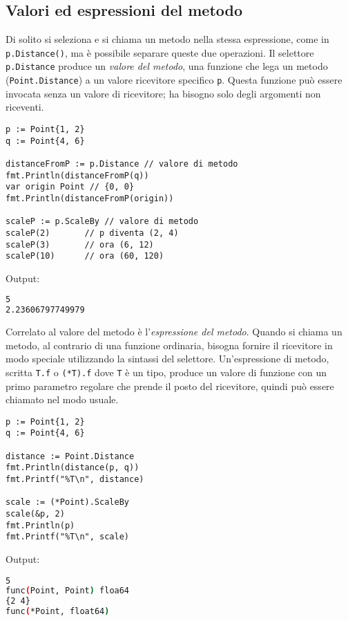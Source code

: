 \documentclass[../../thesis.tex]{subfiles}
\begin{document}
    \subsection{Valori ed espressioni del metodo}\label{subsec:valori-ed-espressioni-del-metodo}
    Di solito si seleziona e si chiama un metodo nella stessa espressione, come in \verb"p.Distance()", ma è possibile separare queste due operazioni.
    Il selettore \verb"p.Distance" produce un \textit{valore del metodo}, una funzione che lega un metodo (\verb"Point.Distance") a un valore ricevitore specifico \verb"p".
    Questa funzione può essere invocata senza un valore di ricevitore;
    ha bisogno solo degli argomenti non riceventi.
    \begin{lstlisting}[frame = single, label = {lst:lstlisting5-4.1}]
p := Point{1, 2}
q := Point{4, 6}

distanceFromP := p.Distance // valore di metodo
fmt.Println(distanceFromP(q))
var origin Point // {0, 0}
fmt.Println(distanceFromP(origin))

scaleP := p.ScaleBy // valore di metodo
scaleP(2)	    // p diventa (2, 4)
scaleP(3)	    // ora (6, 12)
scaleP(10)	    // ora (60, 120)
    \end{lstlisting}
    Output:
    \begin{lstlisting}[language = bash, frame = L, label = {lst:lstlisting5-4.2}]
5
2.23606797749979
    \end{lstlisting}
    Correlato al valore del metodo è l'\textit{espressione del metodo}.
    Quando si chiama un metodo, al contrario di una funzione ordinaria, bisogna fornire il ricevitore in modo speciale utilizzando la sintassi del selettore.
    Un'espressione di metodo, scritta \verb"T.f" o \verb"(*T).f" dove \verb"T" è un tipo, produce un valore di funzione con un primo parametro regolare che prende il posto del ricevitore, quindi può essere chiamato nel modo usuale.
    \begin{lstlisting}[frame = single, label = {lst:lstlisting5-4.3}]
p := Point{1, 2}
q := Point{4, 6}

distance := Point.Distance
fmt.Println(distance(p, q))
fmt.Printf("%T\n", distance)

scale := (*Point).ScaleBy
scale(&p, 2)
fmt.Println(p)
fmt.Printf("%T\n", scale)
    \end{lstlisting}
    Output:
    \begin{lstlisting}[language = bash, frame = L, label = {lst:lstlisting5-4.4}]
5
func(Point, Point) floa64
{2 4}
func(*Point, float64)
    \end{lstlisting}
\end{document}
